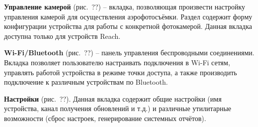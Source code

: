 \begin{dashitemize}
  \item \textbf{Управление камерой} (рис.~??) -- вкладка, позволяющая произвести настройку управления камерой для осуществления аэрофотосъёмки. Раздел содержит форму конфигурации устройства для работы с конкретной фотокамерой. Данная вкладка доступна только для устройств Reach.

  \item \textbf{Wi-Fi/Bluetooth} (рис.~??) -- панель управления беспроводными соединениями. Вкладка позволяет пользователю настраивать подключения в Wi-Fi сетям, управлять работой устройства в режиме точки доступа, а также производить подключение к различным устройствам по Bluetooth.

  \item \textbf{Настройки} (рис.~??). Данная вкладка содержит общие настройки (имя устройства, канал получения обновлений и т.д.) и различные утилитарные возможности (сброс настроек, генерирование системных отчётов).
\end{dashitemize}

\newpage
